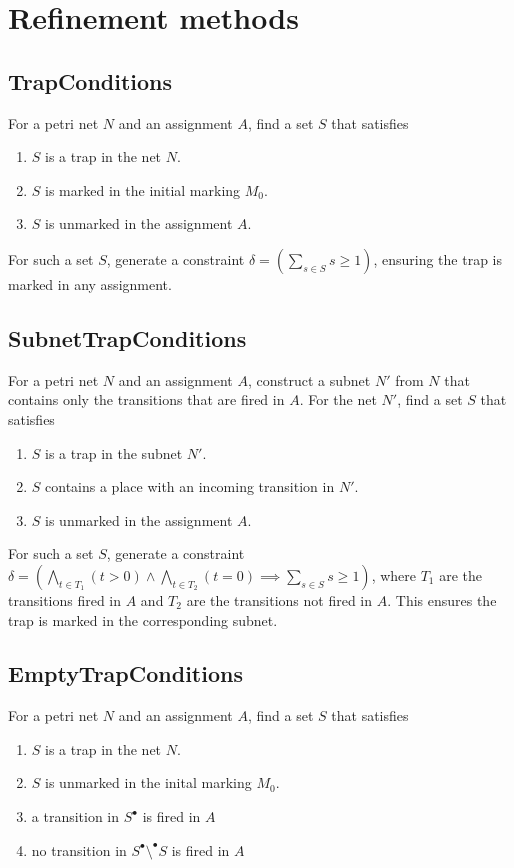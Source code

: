 \documentclass{scrartcl}
\begin{document}
\section{Refinement methods}

\subsection{TrapConditions}

For a petri net $N$ and an assignment $A$,
find a set $S$ that satisfies
\begin{enumerate}
  \item $S$ is a trap in the net $N$.
  \item $S$ is marked in the initial marking $M_0$.
  \item $S$ is unmarked in the assignment $A$.
\end{enumerate}

For such a set $S$, generate a constraint
$\delta = \left( \sum_{s \in S} s \ge 1 \right)$, ensuring the
trap is marked in any assignment.

\subsection{SubnetTrapConditions}

For a petri net $N$ and an assignment $A$,
construct a subnet $N'$ from $N$ that contains only
the transitions that are fired in $A$.
For the net $N'$, find a set $S$ that satisfies
\begin{enumerate}
  \item $S$ is a trap in the subnet $N'$.
  \item $S$ contains a place with an incoming transition in $N'$.
  \item $S$ is unmarked in the assignment $A$.
\end{enumerate}

For such a set $S$, generate a constraint
$\delta = \left( \bigwedge_{t \in T_1} (t > 0) \land
\bigwedge_{t \in T_2} (t = 0) \implies \sum_{s \in S} s \ge 1 \right)$,
where $T_1$ are the transitions fired in $A$ and $T_2$ are the
transitions not fired in $A$. This ensures the trap is marked in the
corresponding subnet.

\subsection{EmptyTrapConditions}

For a petri net $N$ and an assignment $A$,
find a set $S$ that satisfies
\begin{enumerate}
  \item $S$ is a trap in the net $N$.
  \item $S$ is unmarked in the inital marking $M_0$.
  \item a transition in $S^\bullet$ is fired in $A$
  \item no transition in $S^\bullet \setminus ^\bullet S$ is fired in $A$
\end{enumerate}
\end{document}
